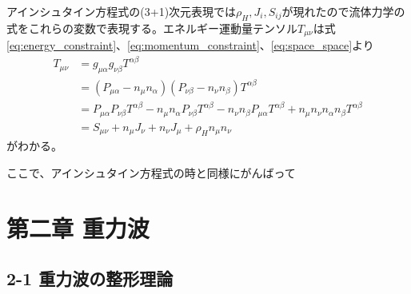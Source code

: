\documentclass[autodetect-engine,dvi=dvipdfmx,ja=standard, 10pt, a4paper]{bxjsarticle}
\begin{document}
アインシュタイン方程式の(3+1)次元表現では$\rho_H, J_i, S_{ij}$が現れたので流体力学の式をこれらの変数で表現する。エネルギー運動量テンソル$T_{\mu\nu}$は式\eqref{eq:energy_constraint}、\eqref{eq:momentum_constraint}、\eqref{eq:space_space}より
\begin{align}
	T_{\mu\nu}& = g_{\mu\alpha}g_{\nu\beta}T^{\alpha\beta}\nonumber\\
	&=(P_{\mu\alpha} - n_\mu n_\alpha)(P_{\nu\beta} - n_\nu n_\beta)T^{\alpha\beta}\nonumber\\
	&=P_{\mu\alpha}P_{\nu\beta}T^{\alpha\beta} - n_\mu n_\alpha P_{\nu\beta}T^{\alpha\beta} - n_\nu n_\beta P_{\mu\alpha}T^{\alpha\beta} + n_\mu n_\nu n_\alpha n_\beta T^{\alpha\beta}\nonumber\\
	&= S_{\mu\nu} + n_\mu J_\nu + n_\nu J_\mu +\rho_H n_\mu n_\nu 
\end{align}
がわかる。

ここで、アインシュタイン方程式の時と同様にがんばって

\section*{第二章 重力波}
\subsection*{2-1 重力波の整形理論}
\end{document}
